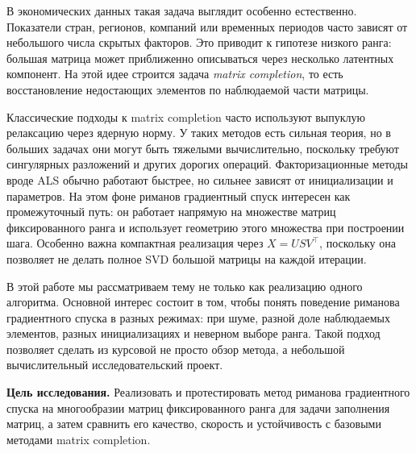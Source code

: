 \documentclass[a4paper,12pt]{article}
\begin{document}
В экономических данных такая задача выглядит особенно естественно. Показатели стран, регионов, компаний или временных периодов часто зависят от небольшого числа скрытых факторов. Это приводит к гипотезе низкого ранга: большая матрица может приближенно описываться через несколько латентных компонент. На этой идее строится задача \textit{matrix completion}, то есть восстановление недостающих элементов по наблюдаемой части матрицы.

Классические подходы к matrix completion часто используют выпуклую релаксацию через ядерную норму. У таких методов есть сильная теория, но в больших задачах они могут быть тяжелыми вычислительно, поскольку требуют сингулярных разложений и других дорогих операций. Факторизационные методы вроде ALS обычно работают быстрее, но сильнее зависят от инициализации и параметров. На этом фоне риманов градиентный спуск интересен как промежуточный путь: он работает напрямую на множестве матриц фиксированного ранга и использует геометрию этого множества при построении шага. Особенно важна компактная реализация через $X=USV^\top$, поскольку она позволяет не делать полное SVD большой матрицы на каждой итерации.

В этой работе мы рассматриваем тему не только как реализацию одного алгоритма. Основной интерес состоит в том, чтобы понять поведение риманова градиентного спуска в разных режимах: при шуме, разной доле наблюдаемых элементов, разных инициализациях и неверном выборе ранга. Такой подход позволяет сделать из курсовой не просто обзор метода, а небольшой вычислительный исследовательский проект.

\textbf{Цель исследования.} Реализовать и протестировать метод риманова градиентного спуска на многообразии матриц фиксированного ранга для задачи заполнения матриц, а затем сравнить его качество, скорость и устойчивость с базовыми методами matrix completion.
\end{document}
